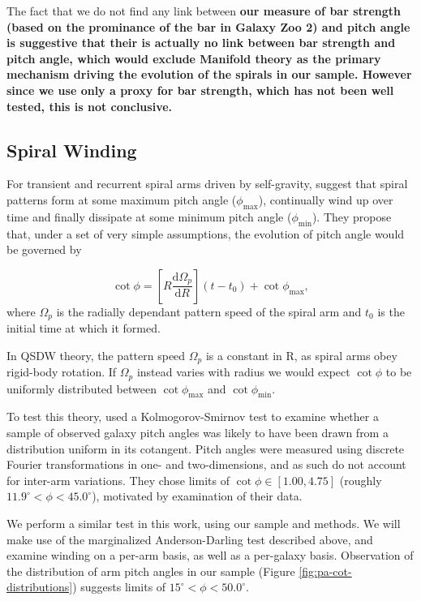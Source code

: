 The fact that we do not find any link between \textbf{our measure of bar strength (based on the prominance of the bar in Galaxy Zoo 2) and pitch angle is suggestive that their is actually no link between bar strength and pitch angle, which would exclude Manifold theory as the primary mechanism driving the evolution of the spirals in our sample. However since we use only a proxy for bar strength, which has not been well tested, this is not conclusive.}

\subsection{Spiral Winding}
\label{section:spiral_winding}

For transient and recurrent spiral arms driven by self-gravity, \citet{2019arXiv190910291P} suggest that spiral patterns form at some maximum pitch angle ($\phi_\mathrm{max}$), continually wind up over time and finally dissipate at some minimum pitch angle ($\phi_\mathrm{min}$). They propose that, under a set of very simple assumptions, the evolution of pitch angle would be governed by

\begin{equation}
  \label{eq:winding}
  \cot{\phi} = \left[R\frac{\mathrm{d}\Omega_p}{\mathrm{d}R}\right](t - t_0) + \cot{\phi_\mathrm{max}},
\end{equation}
where $\Omega_p$ is the radially dependant pattern speed of the spiral arm and $t_0$ is the initial time at which it formed.

In QSDW theory, the pattern speed $\Omega_p$ is a constant in R, as spiral arms obey rigid-body rotation. If $\Omega_p$ instead varies with radius we would expect $\cot{\phi}$ to be uniformly distributed between $\cot{\phi_\mathrm{max}}$ and $\cot{\phi_\mathrm{min}}$.

To test this theory, \citet{2019arXiv190910291P} used a Kolmogorov-Smirnov test to examine whether a sample of observed galaxy pitch angles was likely to have been drawn from a distribution uniform in its cotangent. Pitch angles were measured using discrete Fourier transformations in one- and two-dimensions, and as such do not account for inter-arm variations. They chose limits of $\cot{\phi} \in [1.00, 4.75]$ (roughly $11.9^\circ < \phi < 45.0^\circ$), motivated by examination of their data.

We perform a similar test in this work, using our sample and methods. We will make use of the marginalized Anderson-Darling test described above, and examine winding on a per-arm basis, as well as a per-galaxy basis. Observation of the distribution of arm pitch angles in our sample (Figure \ref{fig:pa-cot-distributions}) suggests limits of $15^\circ < \phi < 50.0^\circ$.

